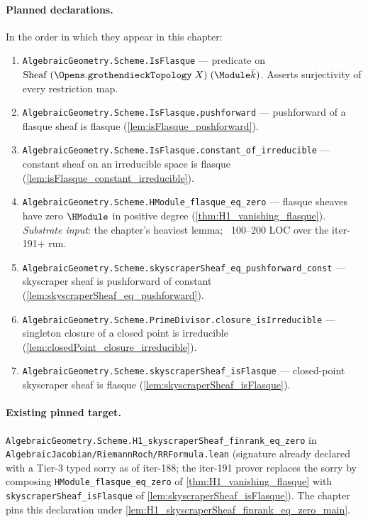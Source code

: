 \paragraph{Planned declarations.} In the order in which they appear in
this chapter:
\begin{enumerate}
  \item \texttt{AlgebraicGeometry.Scheme.IsFlasque} — predicate on
    \(\mathrm{Sheaf}\;(\Opens.\mathtt{grothendieckTopology}\;X)\;
    (\Module \bar k)\). Asserts surjectivity of every restriction map.
  \item \texttt{AlgebraicGeometry.Scheme.IsFlasque.pushforward} —
    pushforward of a flasque sheaf is flasque
    (\cref{lem:isFlasque_pushforward}).
  \item \texttt{AlgebraicGeometry.Scheme.IsFlasque.constant\_of\_irreducible}
    — constant sheaf on an irreducible space is flasque
    (\cref{lem:isFlasque_constant_irreducible}).
  \item \texttt{AlgebraicGeometry.Scheme.HModule\_flasque\_eq\_zero} —
    flasque sheaves have zero \(\HModule\) in positive degree
    (\cref{thm:H1_vanishing_flasque}). \emph{Substrate input}: the
    chapter's heaviest lemma; ~100--200 LOC over the iter-191+ run.
  \item \texttt{AlgebraicGeometry.Scheme.skyscraperSheaf\_eq\_pushforward\_const}
    — skyscraper sheaf is pushforward of constant
    (\cref{lem:skyscraperSheaf_eq_pushforward}).
  \item \texttt{AlgebraicGeometry.Scheme.PrimeDivisor.closure\_isIrreducible}
    — singleton closure of a closed point is irreducible
    (\cref{lem:closedPoint_closure_irreducible}).
  \item \texttt{AlgebraicGeometry.Scheme.skyscraperSheaf\_isFlasque} —
    closed-point skyscraper sheaf is flasque
    (\cref{lem:skyscraperSheaf_isFlasque}).
\end{enumerate}

\paragraph{Existing pinned target.}
\texttt{AlgebraicGeometry.Scheme.H1\_skyscraperSheaf\_finrank\_eq\_zero}
in \texttt{AlgebraicJacobian/RiemannRoch/RRFormula.lean} (signature
already declared with a Tier-3 typed sorry as of iter-188; the iter-191
prover replaces the sorry by composing
\texttt{HModule\_flasque\_eq\_zero} of \cref{thm:H1_vanishing_flasque}
with \texttt{skyscraperSheaf\_isFlasque} of
\cref{lem:skyscraperSheaf_isFlasque}). The chapter pins this
declaration under \cref{lem:H1_skyscraperSheaf_finrank_eq_zero_main}.

